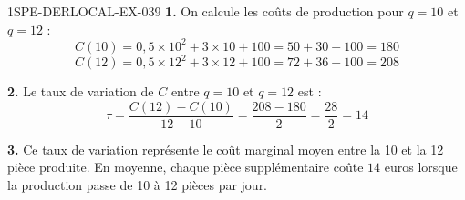\begin{corrige}{1SPE-DERLOCAL-EX-039}
\textbf{1.} On calcule les coûts de production pour $q = 10$ et $q = 12$ :
\[
C(10) = 0{,}5 \times 10^2 + 3 \times 10 + 100 = 50 + 30 + 100 = 180
\]
\[
C(12) = 0{,}5 \times 12^2 + 3 \times 12 + 100 = 72 + 36 + 100 = 208
\]

\textbf{2.} Le taux de variation de $C$ entre $q = 10$ et $q = 12$ est :
\[
\tau = \frac{C(12) - C(10)}{12 - 10} = \frac{208 - 180}{2} = \frac{28}{2} = 14
\]

\textbf{3.} Ce taux de variation représente le coût marginal moyen entre la 10\ieme{} et la 12\ieme{} pièce produite. En moyenne, chaque pièce supplémentaire coûte $\boxed{14}$ euros lorsque la production passe de 10 à 12 pièces par jour.
\end{corrige}

